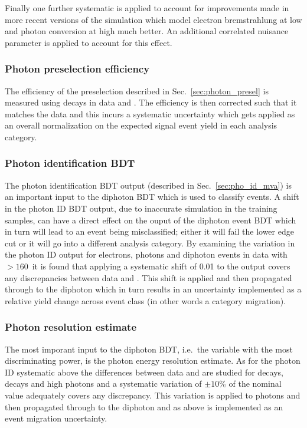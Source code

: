 Finally one further systematic is applied to account for improvements made in more recent versions of the simulation which model electron bremstrahlung at low \pT and photon conversion at high \pT much better. An additional correlated nuisance parameter is applied to account for this effect.

\subsubsection{Photon preselection efficiency}

The efficiency of the preselection described in Sec.~\ref{sec:photon_presel} is measured using \Zee decays in data and \MC. The \MC efficiency is then corrected such that it matches the data and this incurs a systematic uncertainty which gets applied as an overall normalization on the expected signal event yield in each analysis category. 

\subsubsection{Photon identification BDT}

The photon identification BDT output (described in Sec.~\ref{sec:pho_id_mva}) is an important input to the diphoton BDT which is used to classify events. A shift in the photon ID BDT output, due to inaccurate simulation in the training samples, can have a direct effect on the ouput of the diphoton event BDT which in turn will lead to an event being misclassified; either it will fail the lower edge cut or it will go into a different analysis category. By examining the variation in the photon ID output for \Zee electrons, \Zmumugamma photons and diphoton events in data with \mgg$>160$~\GeV it is found that applying a systematic shift of 0.01 to the output covers any discrepancies between data and \MC. This shift is applied and then propagated through to the diphoton \BDT which in turn results in an uncertainty implemented as a relative yield change across event class (in other words a category migration).

\subsubsection{Photon resolution estimate}

The most imporant input to the diphoton BDT, i.e.\ the variable with the most discriminating power, is the photon energy resolution estimate. As for the photon ID systematic above the differences between data and \MC are studied for \Zee decays, \Zmumugamma decays and high \pT photons and a systematic variation of $\pm10$\% of the nominal value adequately covers any discrepancy. This variation is applied to photons and then propagated through to the diphoton \BDT and as above is implemented as an event migration uncertainty.

